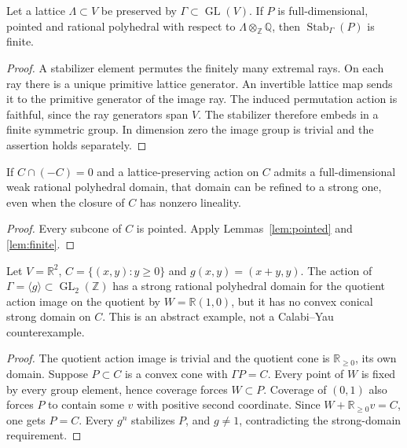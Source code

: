 \begin{lemma}\label{lem:pointed}
Let a lattice $\Lambda\subset V$ be preserved by $\Gamma\subset\operatorname{GL}(V)$. If $P$ is full-dimensional, pointed and rational polyhedral with respect to $\Lambda\otimes_{\mathbb Z}\mathbb Q$, then $\operatorname{Stab}_\Gamma(P)$ is finite.
\end{lemma}
\begin{proof}
A stabilizer element permutes the finitely many extremal rays. On each ray there is a unique primitive lattice generator. An invertible lattice map sends it to the primitive generator of the image ray. The induced permutation action is faithful, since the ray generators span $V$. The stabilizer therefore embeds in a finite symmetric group. In dimension zero the image group is trivial and the assertion holds separately.
\end{proof}

\begin{corollary}\label{cor:pointed}
If $C\cap(-C)=0$ and a lattice-preserving action on $C$ admits a full-dimensional weak rational polyhedral domain, that domain can be refined to a strong one, even when the closure of $C$ has nonzero lineality.
\end{corollary}
\begin{proof}
Every subcone of $C$ is pointed. Apply Lemmas~\ref{lem:pointed} and \ref{lem:finite}.
\end{proof}

\begin{proposition}\label{prop:shear}
Let $V=\mathbb R^2$, $C=\{(x,y):y\geq0\}$ and $g(x,y)=(x+y,y)$. The action of $\Gamma=\langle g\rangle\subset\operatorname{GL}_2(\mathbb Z)$ has a strong rational polyhedral domain for the quotient action image on the quotient by $W=\mathbb R(1,0)$, but it has no convex conical strong domain on $C$. This is an abstract example, not a Calabi--Yau counterexample.
\end{proposition}
\begin{proof}
The quotient action image is trivial and the quotient cone is $\mathbb R_{\geq0}$, its own domain. Suppose $P\subset C$ is a convex cone with $\Gamma P=C$. Every point of $W$ is fixed by every group element, hence coverage forces $W\subset P$. Coverage of $(0,1)$ also forces $P$ to contain some $v$ with positive second coordinate. Since $W+\mathbb R_{\geq0}v=C$, one gets $P=C$. Every $g^n$ stabilizes $P$, and $g\neq1$, contradicting the strong-domain requirement.
\end{proof}


